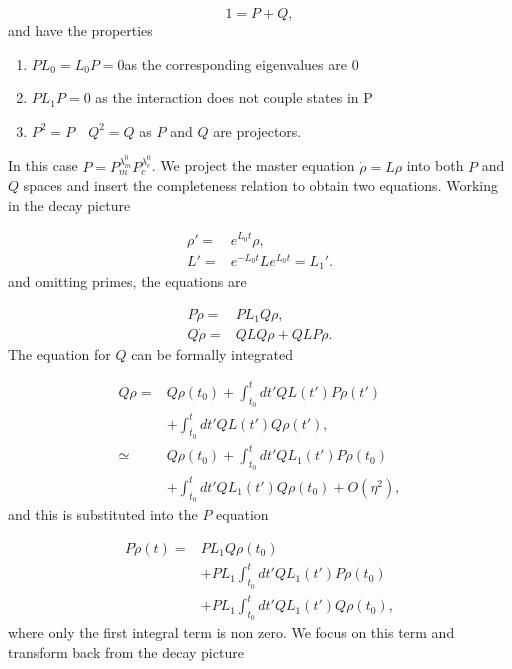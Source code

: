 \documentclass[reprint, amsmath,amssymb, aps,pra]{revtex4-1}
\begin{document}
\begin{equation}
1 = P + Q,
\end{equation} and have the properties

\begin{enumerate}

\item $ PL_{0} = L_{0}P = 0 $\qquad as the corresponding eigenvalues are 0

\item $PL_{1}P=0$ \qquad as the interaction does not couple states in P

\item $P^2 = P \quad Q^2 = Q$ \qquad as $P$ and $Q$ are projectors.
\end{enumerate} In this case $P=P_m^{\lambda_m^0}P_c^{\lambda_c^0}$. We project the master equation $\dot{\rho}=L\rho$ into both $P$ and $Q$ spaces and insert the completeness relation to obtain two equations. Working in the decay picture

\begin{align*}
 \rho' =& e^{L_0t}\rho,\\
 L' =& e^{-L_0t}Le^{L_0t} = L_1'.
\end{align*} and omitting primes, the equations are

\begin{align*}
P\dot{\rho} =& PL_1Q\rho, \\
Q\dot{\rho} =& QLQ\rho + QLP\rho.
\end{align*} The equation for $Q$ can be formally integrated \cite{TesisMaestria}

\begin{align*}
Q\rho =& Q\rho(t_0) + \int_{t_0}^{t}dt' QL(t')P\rho(t')\\
       &+\int_{t_0}^{t}dt'QL(t')Q\rho(t'),\\
\simeq & Q\rho(t_0) + \int_{t_0}^{t}dt' QL_1(t')P\rho(t_0)\\
       &+\int_{t_0}^{t}dt'QL_1(t')Q\rho(t_0)+O(\eta^2),
\end{align*} and this is substituted into the $P$ equation

\begin{align}
P\dot{\rho}(t) =& PL_1Q\rho(t_0)\\ 
 &+ PL_1\int_{t_0}^{t}dt' QL_1(t')P\rho(t_0)\nonumber \\
 &+ PL_1\int_{t_0}^{t}dt'QL_1(t')Q\rho(t_0) \nonumber,
\end{align} where only the first integral term is non zero. We focus on this term and transform back from the decay picture
\end{document}
